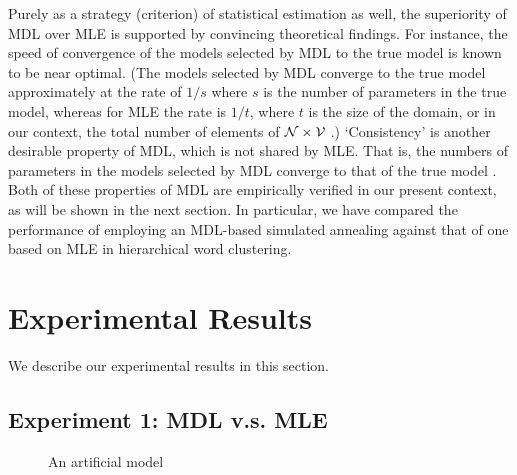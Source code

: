 Purely as a strategy (criterion) of statistical estimation as well,
the superiority of MDL over MLE is supported by convincing theoretical
findings. For instance, the speed of convergence of the models
selected by MDL to the true model is known to be near optimal. (The
models selected by MDL converge to the true model approximately at the
rate of $1/s$ where $s$ is the number of parameters in the true model,
whereas for MLE the rate is $1/t$, where $t$ is the size of the
domain, or in our context, the total number of elements of ${\cal N}
\times {\cal V}$ \cite{Barron91}\cite{Yamanishi92}.) `Consistency' is
another desirable property of MDL, which is not shared by MLE. That
is, the numbers of parameters in the models selected by MDL converge
to that of the true model \cite{Rissanen84}. Both of these properties
of MDL are empirically verified in our present context, as will be
shown in the next section. In particular, we have compared the
performance of employing an MDL-based simulated annealing against that
of one based on MLE in hierarchical word clustering.

\section{Experimental Results}
We describe our experimental results in this section.

\subsection{Experiment 1: MDL v.s. MLE}
\begin{figure*}[htb]
\begin{center}
\caption{An artificial model}
\label{fig:model1} 
\end{center}
\end{figure*}

